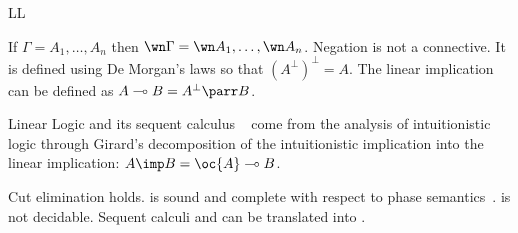 \begin{entry}{LL}
\begin{clarifications}
If $\Gamma=A_1,\dots,A_n$ then $\wn\Gamma=\wn A_1,\dots,\wn A_n$.
Negation is not a connective. It is defined using De Morgan's laws so that $(A^\bot)^\bot=A$.
The linear implication can be defined as $A\multimap B = A^\bot\parr B$.
\end{clarifications}

\begin{history}
Linear Logic and its sequent calculus \LL~\cite{ll} come from the analysis of intuitionistic logic through Girard's decomposition of the intuitionistic implication into the linear implication: $A\imp B = \oc{A}\multimap B$.
\end{history}

\begin{technicalities}
Cut elimination holds.
\LL{} is sound and complete with respect to phase semantics~\cite{ll}.
\LL{} is not decidable.
Sequent calculi \LK{} and \LJ{} can be translated into \LL.
\end{technicalities}













\end{entry}



